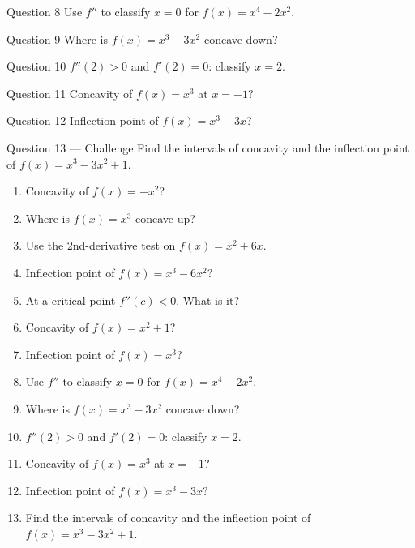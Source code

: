 \documentclass[11pt]{article}
\begin{document}
\begin{qbox}{Question 8}
Use $f''$ to classify $x=0$ for $f(x)=x^4-2x^2$.\workspace{2.4cm}
\end{qbox}

\begin{qbox}{Question 9}
Where is $f(x)=x^3-3x^2$ concave down?\workspace{2.4cm}
\end{qbox}

\begin{qbox}{Question 10}
$f''(2)>0$ and $f'(2)=0$: classify $x=2$.\workspace{2.4cm}
\end{qbox}

\begin{qbox}{Question 11}
Concavity of $f(x)=x^3$ at $x=-1$?\workspace{2.4cm}
\end{qbox}

\begin{qbox}{Question 12}
Inflection point of $f(x)=x^3-3x$?\workspace{2.4cm}
\end{qbox}

\begin{qbox}{Question 13 --- Challenge}
Find the intervals of concavity and the inflection point of $f(x)=x^3-3x^2+1$.\workspace{3.5cm}
\end{qbox}

\clearpage
{}

\begin{recapbox}
\begin{multicols}{2}
\small
\begin{enumerate}[leftmargin=*,itemsep=3pt]
  \item Concavity of $f(x)=-x^2$?
  \item Where is $f(x)=x^3$ concave up?
  \item Use the 2nd-derivative test on $f(x)=x^2+6x$.
  \item Inflection point of $f(x)=x^3-6x^2$?
  \item At a critical point $f''(c)<0$. What is it?
  \item Concavity of $f(x)=x^2+1$?
  \item Inflection point of $f(x)=x^3$?
  \item Use $f''$ to classify $x=0$ for $f(x)=x^4-2x^2$.
  \item Where is $f(x)=x^3-3x^2$ concave down?
  \item $f''(2)>0$ and $f'(2)=0$: classify $x=2$.
  \item Concavity of $f(x)=x^3$ at $x=-1$?
  \item Inflection point of $f(x)=x^3-3x$?
  \item Find the intervals of concavity and the inflection point of $f(x)=x^3-3x^2+1$.
\end{enumerate}
\end{multicols}
\end{recapbox}
\end{document}
